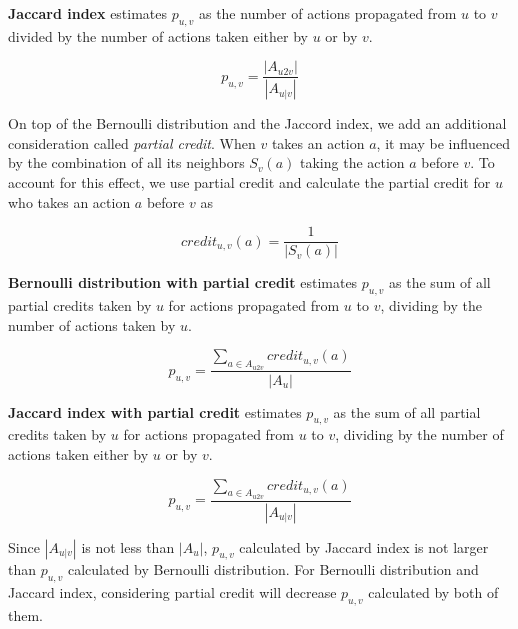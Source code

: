 {\bf Jaccard index} estimates 
$p_{u,v}$ as the number of actions propagated from $u$ to $v$ divided by 
the number of actions taken either by $u$ or by $v$.

$$p_{u,v} = \frac{|A_{u2v}|}{|A_{u|v}|}$$ 

On top of the Bernoulli distribution and the Jaccord index,
we add an additional consideration called {\em partial credit}.
When $v$ takes an action $a$, it may be influenced by the combination of all its neighbors $S_v(a)$ 
taking the action $a$ before $v$. %
To account for this effect, we use partial credit 
and calculate the partial credit for $u$ who takes an action $a$ before $v$ as 

$$credit_{u,v}(a) = \frac{1}{|S_v(a)|}$$

{\bf Bernoulli distribution with partial credit} 
estimates $p_{u,v}$ as the sum of all partial credits taken by $u$ for actions propagated from $u$ to $v$, 
dividing by the number of actions taken by $u$. 

$$p_{u,v} = \frac{\sum\limits_{a \in A_{u2v}}{credit_{u,v}(a)}}{|A_u|}$$

{\bf Jaccard index with partial credit} 
estimates $p_{u,v}$ as the sum of all partial credits taken by $u$ for actions propagated from $u$ to $v$, 
dividing by the number of actions taken either by $u$ or by $v$. 

$$p_{u,v} = \frac{\sum\limits_{a \in A_{u2v}}{credit_{u,v}(a)}}{|A_{u|v}|}$$


Since $|A_{u|v}|$ is not less than $|A_u|$, 
$p_{u,v}$ calculated by Jaccard index is not larger than $p_{u,v}$ calculated by Bernoulli distribution. 
For Bernoulli distribution and Jaccard index, 
considering partial credit will decrease $p_{u,v}$ calculated by both of them. 


